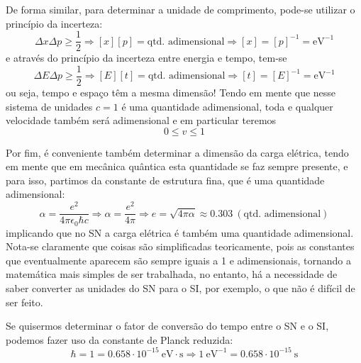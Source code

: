 De forma similar, para determinar a unidade de comprimento, pode-se utilizar o princípio da incerteza:
    \begin{equation*}
        \Delta x \Delta p \geqslant \dfrac{1}{2} \Rightarrow [x] [p] = \text{qtd. adimensional} \Rightarrow [x] = [p]^{-1} = \text{eV}^{-1}
    \end{equation*}
e através do princípio da incerteza entre energia e tempo, tem-se
    \begin{equation*}
        \Delta E \Delta p \geqslant \dfrac{1}{2} \Rightarrow [E] [t] = \text{qtd. adimensional} \Rightarrow [t] = [E]^{-1} = \text{eV}^{-1}
    \end{equation*}
ou seja, tempo e espaço têm a mesma dimensão! Tendo em mente que nesse sistema de unidades $c = 1$ é uma quantidade adimensional, toda e qualquer velocidade também será adimensional e em particular teremos
    \begin{equation*}
        0 \leqslant v \leqslant 1
    \end{equation*}

Por fim, é conveniente também determinar a dimensão da carga elétrica, tendo em mente que em mecânica quântica esta quantidade se faz sempre presente, e para isso, partimos da constante de estrutura fina, que é uma quantidade adimensional:
    \begin{equation*}
        \alpha = \dfrac{e^2}{4 \pi \epsilon_{0} \hbar c} \Rightarrow \alpha = \dfrac{e^2}{4\pi} \Rightarrow e = \sqrt{4\pi\alpha} \approx 0.303\ (\text{qtd. adimensional})
    \end{equation*}
implicando que no SN a carga elétrica é também uma quantidade adimensional. Nota-se claramente que coisas são simplificadas teoricamente, pois as constantes que eventualmente aparecem são sempre iguais a 1 e adimensionais, tornando a matemática mais simples de ser trabalhada, no entanto, há a necessidade de saber converter as unidades do SN para o SI, por exemplo, o que não é difícil de ser feito.
    \begin{example}
        Se quisermos determinar o fator de conversão do tempo entre o SN e o SI, podemos fazer uso da constante de Planck reduzida:
            \begin{equation*}
                \hbar = 1 = 0.658 \cdot 10^{-15}\ \mathrm{eV\cdot s} \Rightarrow 
                1\ \mathrm{eV}^{-1} = 0.658\cdot 10^{-15}\ \text{s}
            \end{equation*}
    \end{example}

